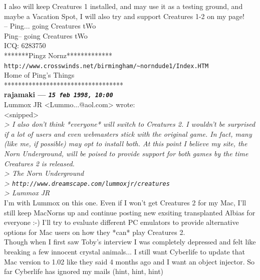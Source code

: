 \documentclass[11pt,twoside,a4paper]{article}
\begin{document}
\begin{multicols*}{2}
I also will keep Creatures 1 installed, and may use it as a testing ground, and maybe a Vacation Spot, I will also try and support Creatures 1-2 on my page!~\\

-- Ping... going Creatures tWo~\\
Ping-- going Creatures tWo~\\
ICQ:  6283750~\\
*******Pingz Nornz*************~\\
\texttt{http://www.crosswinds.net/birmingham/\textasciitilde norndude1/Index.HTM}~\\
Home of Ping's Things~\\
**********************************~\\

 
		
	
		
\textbf{rajamaki --- \emph{\texttt{15 feb 1998, 10:00}}}~\\

Lummox JR <Lummo...@aol.com> wrote:~\\
<snipped>~\\
\emph{> I also don't think *everyone* will switch to Creatures 2. I wouldn't be surprised if a lot of users and even webmasters stick with the original game. In fact, many (like me, if possible) may opt to install both. At this point I believe my site, the Norn Underground, will be poised to provide support for both games by the time Creatures 2 is released.}~\\

\emph{> The Norn Underground}~\\
\emph{> \texttt{http://www.dreamscape.com/lummoxjr/creatures}}~\\
\emph{> Lummox JR}~\\

I'm with Lummox on this one. Even if I won't get Creatures 2 for my Mac, I'll still keep MacNorns up and continue posting new exsiting transplanted Albias for everyone :-) I'll try to evaluate different PC emulators to provide alternative options for Mac users on how they *can* play Creatures 2.~\\

Though when I first saw Toby's interview I was completely depressed and felt like breaking a few innocent crystal animals...  I still want Cyberlife to update that Mac version to 1.02 like they said 4 months ago and I want an object injector. So far Cyberlife has ignored my mails (hint, hint, hint)~\\


\end{multicols*}
\end{document}
